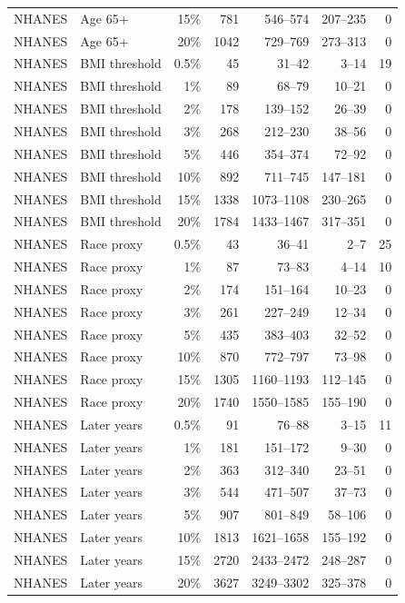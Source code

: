 \begin{longtable}{llrrrrr}
NHANES & Age 65+ & 15\% & 781 & 546--574 & 207--235 & 0 \\
NHANES & Age 65+ & 20\% & 1042 & 729--769 & 273--313 & 0 \\
NHANES & BMI threshold & 0.5\% & 45 & 31--42 & 3--14 & 19 \\
NHANES & BMI threshold & 1\% & 89 & 68--79 & 10--21 & 0 \\
NHANES & BMI threshold & 2\% & 178 & 139--152 & 26--39 & 0 \\
NHANES & BMI threshold & 3\% & 268 & 212--230 & 38--56 & 0 \\
NHANES & BMI threshold & 5\% & 446 & 354--374 & 72--92 & 0 \\
NHANES & BMI threshold & 10\% & 892 & 711--745 & 147--181 & 0 \\
NHANES & BMI threshold & 15\% & 1338 & 1073--1108 & 230--265 & 0 \\
NHANES & BMI threshold & 20\% & 1784 & 1433--1467 & 317--351 & 0 \\
NHANES & Race proxy & 0.5\% & 43 & 36--41 & 2--7 & 25 \\
NHANES & Race proxy & 1\% & 87 & 73--83 & 4--14 & 10 \\
NHANES & Race proxy & 2\% & 174 & 151--164 & 10--23 & 0 \\
NHANES & Race proxy & 3\% & 261 & 227--249 & 12--34 & 0 \\
NHANES & Race proxy & 5\% & 435 & 383--403 & 32--52 & 0 \\
NHANES & Race proxy & 10\% & 870 & 772--797 & 73--98 & 0 \\
NHANES & Race proxy & 15\% & 1305 & 1160--1193 & 112--145 & 0 \\
NHANES & Race proxy & 20\% & 1740 & 1550--1585 & 155--190 & 0 \\
NHANES & Later years & 0.5\% & 91 & 76--88 & 3--15 & 11 \\
NHANES & Later years & 1\% & 181 & 151--172 & 9--30 & 0 \\
NHANES & Later years & 2\% & 363 & 312--340 & 23--51 & 0 \\
NHANES & Later years & 3\% & 544 & 471--507 & 37--73 & 0 \\
NHANES & Later years & 5\% & 907 & 801--849 & 58--106 & 0 \\
NHANES & Later years & 10\% & 1813 & 1621--1658 & 155--192 & 0 \\
NHANES & Later years & 15\% & 2720 & 2433--2472 & 248--287 & 0 \\
NHANES & Later years & 20\% & 3627 & 3249--3302 & 325--378 & 0 \\

\end{longtable}
